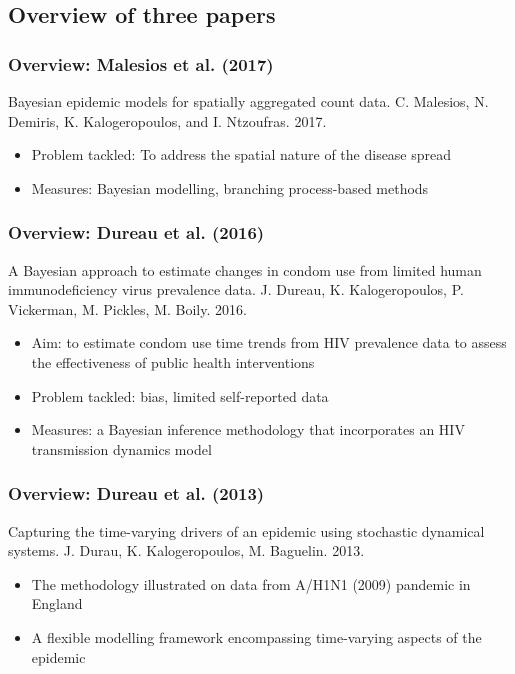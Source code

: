\documentclass{beamer}
\begin{document}
\subsection{Overview of three papers}

\begin{frame}
    \frametitle{Overview: Malesios et al. (2017)}
    Bayesian epidemic models for spatially aggregated count data. C. Malesios, N. Demiris, K. Kalogeropoulos, and I. Ntzoufras. 2017.
    \vspace{1em}
    \begin{itemize}
        \item Problem tackled: To address the spatial nature of the disease spread
        \item Measures: Bayesian modelling, branching process-based methods
    \end{itemize}
\end{frame}

\begin{frame}
    \frametitle{Overview: Dureau et al. (2016)}
    A Bayesian approach to estimate changes in condom use from limited human immunodeficiency virus prevalence data. J. Dureau, K. Kalogeropoulos, P. Vickerman, M. Pickles, M. Boily. 2016.
    \vspace{1em}
    \begin{itemize}
        \item Aim: to estimate condom use time trends from HIV prevalence data  to
    assess the effectiveness of public health interventions
        \item Problem tackled: bias, limited self-reported data
        \item Measures: a Bayesian inference methodology that incorporates an HIV transmission dynamics model
    \end{itemize}
\end{frame}

\begin{frame}
    \frametitle{Overview: Dureau et al. (2013)}
    Capturing the time-varying drivers of an epidemic using stochastic dynamical systems. J. Durau, K. Kalogeropoulos, M. Baguelin. 2013.
    \vspace{1em}
    \begin{itemize}
        \item The methodology illustrated on data from A/H1N1 (2009) pandemic in England
        \item A flexible modelling framework encompassing time-varying aspects of the epidemic
    \end{itemize}
\end{frame}
\end{document}
